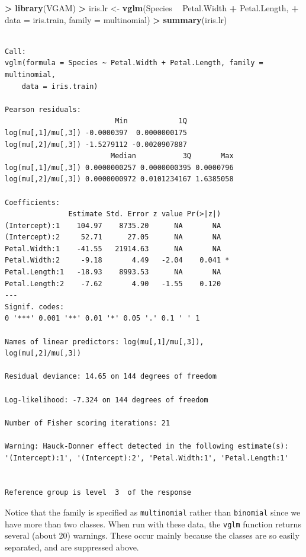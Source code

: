 \documentclass[]{krantz}
\makeatletter
\newenvironment{Shaded}{\begin{snugshade}}{\end{snugshade}}
\newcommand{\KeywordTok}[1]{\textcolor[rgb]{0.27,0.27,0.27}{\textbf{#1}}}
\newcommand{\DataTypeTok}[1]{\textcolor[rgb]{0.27,0.27,0.27}{#1}}
\newcommand{\StringTok}[1]{\textcolor[rgb]{0.5,0.5,0.5}{#1}}
\newcommand{\OperatorTok}[1]{\textcolor[rgb]{0.43,0.43,0.43}{\textbf{#1}}}
\newcommand{\NormalTok}[1]{#1}
\newenvironment{kframe}{%
\medskip{}
\setlength{\fboxsep}{.8em}
 \def\at@end@of@kframe{}%
 \ifinner\ifhmode%
  \def\at@end@of@kframe{\end{minipage}}%
  \begin{minipage}{\columnwidth}%
 \fi\fi%
 \def\FrameCommand##1{\hskip\@totalleftmargin \hskip-\fboxsep
 \colorbox{shadecolor}{##1}\hskip-\fboxsep
     \hskip-\linewidth \hskip-\@totalleftmargin \hskip\columnwidth}%
 \MakeFramed {\advance\hsize-\width
   \@totalleftmargin\z@ \linewidth\hsize
   \@setminipage}}%
 {\par\unskip\endMakeFramed%
 \at@end@of@kframe}
\renewenvironment{Shaded}{\begin{kframe}}{\end{kframe}}
\makeatother
\begin{document}
\begin{Shaded}
\begin{Highlighting}[]
\OperatorTok{>}\StringTok{ }\KeywordTok{library}\NormalTok{(VGAM)}
\OperatorTok{>}\StringTok{ }\NormalTok{iris.lr <-}\StringTok{ }\KeywordTok{vglm}\NormalTok{(Species }\OperatorTok{~}\StringTok{ }\NormalTok{Petal.Width }\OperatorTok{+}\StringTok{ }\NormalTok{Petal.Length, }
\OperatorTok{+}\StringTok{                 }\DataTypeTok{data =}\NormalTok{ iris.train, }\DataTypeTok{family =}\NormalTok{ multinomial)}
\OperatorTok{>}\StringTok{ }\KeywordTok{summary}\NormalTok{(iris.lr)}
\end{Highlighting}
\end{Shaded}

\begin{verbatim}

Call:
vglm(formula = Species ~ Petal.Width + Petal.Length, family = multinomial, 
    data = iris.train)

Pearson residuals:
                          Min            1Q
log(mu[,1]/mu[,3]) -0.0000397  0.0000000175
log(mu[,2]/mu[,3]) -1.5279112 -0.0020907887
                         Median           3Q       Max
log(mu[,1]/mu[,3]) 0.0000000257 0.0000000395 0.0000796
log(mu[,2]/mu[,3]) 0.0000000972 0.0101234167 1.6385058

Coefficients: 
               Estimate Std. Error z value Pr(>|z|)  
(Intercept):1    104.97    8735.20      NA       NA  
(Intercept):2     52.71      27.05      NA       NA  
Petal.Width:1    -41.55   21914.63      NA       NA  
Petal.Width:2     -9.18       4.49   -2.04    0.041 *
Petal.Length:1   -18.93    8993.53      NA       NA  
Petal.Length:2    -7.62       4.90   -1.55    0.120  
---
Signif. codes:  
0 '***' 0.001 '**' 0.01 '*' 0.05 '.' 0.1 ' ' 1

Names of linear predictors: log(mu[,1]/mu[,3]), 
log(mu[,2]/mu[,3])

Residual deviance: 14.65 on 144 degrees of freedom

Log-likelihood: -7.324 on 144 degrees of freedom

Number of Fisher scoring iterations: 21 

Warning: Hauck-Donner effect detected in the following estimate(s):
'(Intercept):1', '(Intercept):2', 'Petal.Width:1', 'Petal.Length:1'


Reference group is level  3  of the response
\end{verbatim}

Notice that the family is specified as \texttt{multinomial} rather than
\texttt{binomial} since we have more than two classes. When run with
these data, the \texttt{vglm} function returns several (about 20)
warnings. These occur mainly because the classes are so easily
separated, and are suppressed above.
\end{document}
